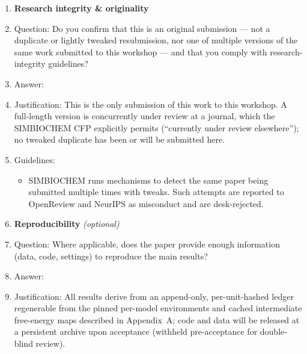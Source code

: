 \begin{enumerate}
\item {\bf Research integrity \& originality}
    \item[] Question: Do you confirm that this is an original submission --- not a duplicate or lightly tweaked resubmission, nor one of multiple versions of the same work submitted to this workshop --- and that you comply with research-integrity guidelines?
    \item[] Answer: \answerYes{}
    \item[] Justification: This is the only submission of this work to this workshop. A full-length version is concurrently under review at a journal, which the SIMBIOCHEM CFP explicitly permits (``currently under review elsewhere''); no tweaked duplicate has been or will be submitted here.
    \item[] Guidelines:
    \begin{itemize}
        \item SIMBIOCHEM runs mechanisms to detect the same paper being submitted multiple times with tweaks. Such attempts are reported to OpenReview and NeurIPS as misconduct and are desk-rejected.
    \end{itemize}

\item {\bf Reproducibility} \emph{(optional)}
    \item[] Question: Where applicable, does the paper provide enough information (data, code, settings) to reproduce the main results?
    \item[] Answer: \answerYes{}
    \item[] Justification: All results derive from an append-only, per-unit-hashed ledger regenerable from the pinned per-model environments and cached intermediate free-energy maps described in Appendix~A; code and data will be released at a persistent archive upon acceptance (withheld pre-acceptance for double-blind review).

\end{enumerate}
